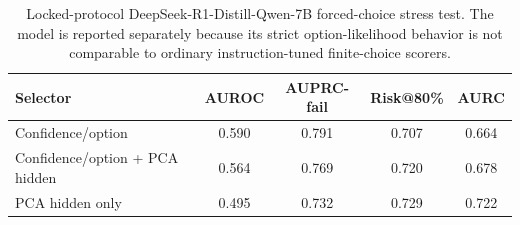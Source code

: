 
\begin{table}[t]
\centering
\small
\caption{Locked-protocol DeepSeek-R1-Distill-Qwen-7B forced-choice stress test. The model is reported separately because its strict option-likelihood behavior is not comparable to ordinary instruction-tuned finite-choice scorers.}
\label{tab:locked-deepseek-stress}
\begin{tabular}{lcccc}
\toprule
Selector & AUROC & AUPRC-fail & Risk@80\% & AURC \\
\midrule
Confidence/option & 0.590 & 0.791 & 0.707 & 0.664 \\
Confidence/option + PCA hidden & 0.564 & 0.769 & 0.720 & 0.678 \\
PCA hidden only & 0.495 & 0.732 & 0.729 & 0.722 \\
\bottomrule
\end{tabular}
\end{table}
